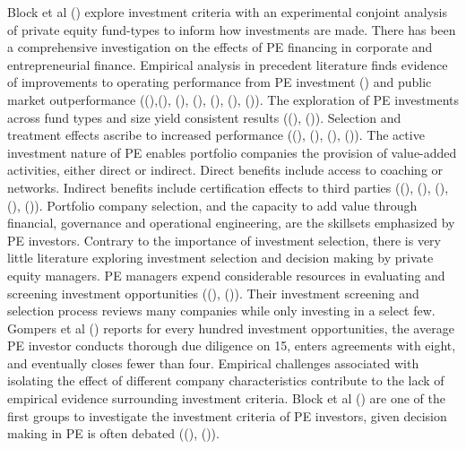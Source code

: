 \documentclass[12pt]{article}
\begin{document}
Block et al (\citeyear{BLOCK2019329}) explore investment criteria with an experimental conjoint analysis of private equity fund-types to inform how investments are made.
There has been a comprehensive investigation on the effects of PE financing in corporate and entrepreneurial finance.
Empirical analysis in precedent literature finds evidence of improvements to operating performance from PE investment (\cite{kaplan2009leveraged}) and public market outperformance ((\cite{ang2018estimating}),(\cite{braun2017persistent}), (\cite{harris2014private}), (\cite{kaplan2005private}), (\cite{kaplan2015private}), (\cite{phalippou2009performance}), (\cite{robinson2013private})).
The exploration of PE investments across fund types and size yield consistent results ((\cite{kaplan1989effects}), (\cite{chemmanur2011does})).
Selection and treatment effects ascribe to increased performance ((\cite{bengtsson2011investor}), (\cite{bernstein2016impact}), (\cite{RIN2013573}), (\cite{LCVC})).
The active investment nature of PE enables portfolio companies the provision of value-added activities, either direct or indirect.
Direct benefits include access to coaching or networks. 
Indirect benefits include certification effects to third parties ((\cite{BOTTAZZI2008488}), (\cite{gompers2001venture}), (\cite{hellmann2002venture}), (\cite{korteweg2017skill}), (\cite{lerner1995venture})).
Portfolio company selection, and the capacity to add value through financial, governance and operational engineering, are the skillsets emphasized by PE investors. 
Contrary to the importance of investment selection, there is very little literature exploring investment selection and decision making by private equity managers.
PE managers expend considerable resources in evaluating and screening investment opportunities ((\cite{kaplan2001venture}), (\cite{gompers2016private})).
Their investment screening and selection process reviews many companies while only investing in a select few.
Gompers et al (\cite{gompers2016private}) reports for every hundred investment opportunities, the average PE investor conducts thorough due diligence on 15, 
enters agreements with eight, and eventually closes fewer than four. 
Empirical challenges associated with isolating the effect of different company characteristics contribute to the lack of empirical evidence surrounding investment criteria.
Block et al (\citeyear{BLOCK2019329}) are one of the first groups to investigate the investment criteria of PE investors, given decision making in PE is often debated ((\cite{gompers2001venture}), (\cite{kaplan2004characteristics})).
\end{document}
